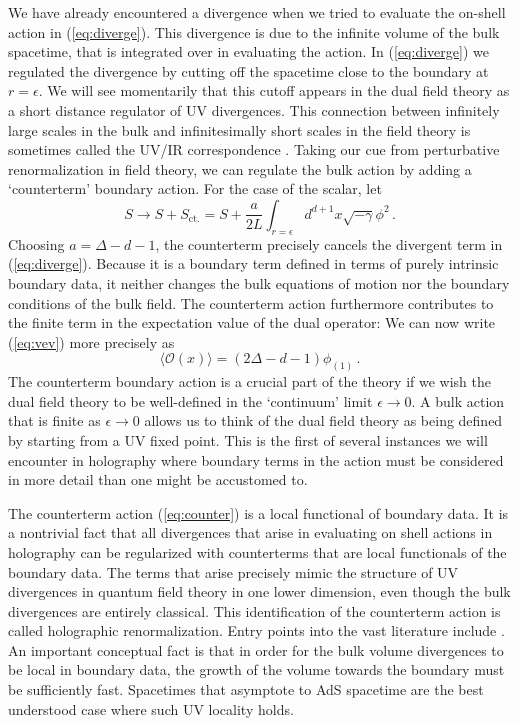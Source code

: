 \documentclass[10pt, oneside]{book}
\def\be{\begin{equation}}
\def\ee{\end{equation}}
\def\ocal{{\mathcal{O}}}
\begin{document}
\begin{doublespace}
We have already encountered a divergence when we tried to evaluate the on-shell action in (\ref{eq:diverge}). This divergence
is due to the infinite volume of the bulk spacetime, that is integrated over in evaluating the action. In (\ref{eq:diverge}) we regulated the divergence by cutting off the spacetime close to the boundary at $r = \epsilon$. We will see momentarily that this cutoff appears in the dual field theory as a short distance regulator of UV divergences. This connection between infinitely large scales in the bulk and infinitesimally short scales in the field theory is sometimes called the UV/IR correspondence \cite{Susskind:1998dq}. Taking our cue from perturbative renormalization in field theory, we can regulate the bulk action by adding a `counterterm' boundary action. For the case of the scalar, let
\be\label{eq:counter}
S \to S + S_\text{ct.} = S + \frac{a}{2 L} \int_{r=\epsilon} d^{d+1}x \sqrt{-\gamma} \phi^2 \,.
\ee
Choosing $a=\Delta-d-1$, the counterterm precisely cancels the divergent term in (\ref{eq:diverge}). Because it is a boundary term defined in terms of purely intrinsic boundary data, it neither changes the bulk equations of motion nor the boundary conditions of the bulk field. The counterterm action furthermore contributes to the finite term in the expectation value of the dual operator: We can now write (\ref{eq:vev}) more precisely as
\be\label{eq:nicevev}
\langle \ocal(x) \rangle =  (2 \Delta - d-1) \phi_{(1)} \,.
\ee
The counterterm boundary action is a crucial part of the theory if we wish the dual field theory to be well-defined in the `continuum' limit $\epsilon \to 0$. A bulk action that is finite as $\epsilon \to 0$ allows us to think of the dual field theory as being defined by starting from a UV fixed point. This is the first of several instances we will encounter in holography where boundary terms in the action must be considered in more detail than one might be accustomed to.

The counterterm action (\ref{eq:counter}) is a local functional of boundary data. It is a nontrivial fact that all divergences that arise in evaluating on shell actions in holography can be regularized with counterterms that are local functionals of the boundary data. The terms that arise precisely mimic the structure of UV divergences in quantum field theory in one lower dimension, even though the bulk divergences are entirely classical. This identification of the counterterm action is called holographic renormalization. Entry points into the vast literature include \cite{deHaro:2000xn, Skenderis:2002wp}. An important conceptual fact is that in order for the bulk volume divergences to be local in boundary data, the growth of the volume towards the boundary must be sufficiently fast. Spacetimes that asymptote to AdS spacetime are the best understood case where such UV locality holds.


\end{doublespace}
\end{document}
